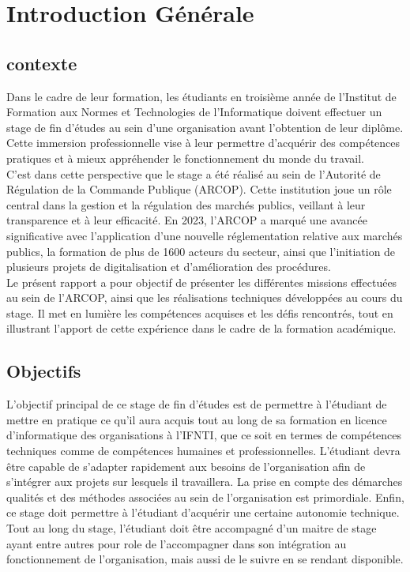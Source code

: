 \chapter{Introduction Générale}
\clearpage
\section{contexte}
Dans le cadre de leur formation, les étudiants en troisième année de l'Institut de Formation aux Normes et Technologies de l'Informatique doivent effectuer un stage de fin d’études au sein d’une organisation avant l’obtention de leur diplôme. Cette immersion professionnelle vise à leur permettre d’acquérir des compétences pratiques et à mieux appréhender le fonctionnement du monde du travail.\\

C’est dans cette perspective que le stage a été réalisé au sein de l’Autorité de Régulation de la Commande Publique (ARCOP). Cette institution joue un rôle central dans la gestion et la régulation des marchés publics, veillant à leur transparence et à leur efficacité. En 2023, l’ARCOP a marqué une avancée significative avec l’application d’une nouvelle réglementation relative aux marchés publics, la formation de plus de 1600 acteurs du secteur, ainsi que l’initiation de plusieurs projets de digitalisation et d’amélioration des procédures.\\

Le présent rapport a pour objectif de présenter les différentes missions effectuées au sein de l’ARCOP, ainsi que les réalisations techniques développées au cours du stage. Il met en lumière les compétences acquises et les défis rencontrés, tout en illustrant l’apport de cette expérience dans le cadre de la formation académique.\\

\section{Objectifs}
L’objectif principal de ce stage de fin d’études est de permettre à l’étudiant de mettre en pratique ce qu’il aura acquis tout au long de sa formation en licence d’informatique des organisations à l’IFNTI, que ce soit en termes de compétences techniques comme de compétences humaines et professionnelles. L’étudiant devra être capable de s’adapter rapidement aux besoins de l’organisation afin de s’intégrer aux projets sur lesquels il travaillera. La prise en compte des démarches qualités et des méthodes associées au sein de l’organisation est primordiale. Enfin, ce stage doit permettre à l’étudiant d’acquérir une certaine autonomie technique.\\
Tout au long du stage, l’étudiant doit être accompagné d’un maitre de stage ayant entre autres pour role de l’accompagner dans son intégration au fonctionnement de l’organisation, mais aussi de le suivre en se rendant disponible.